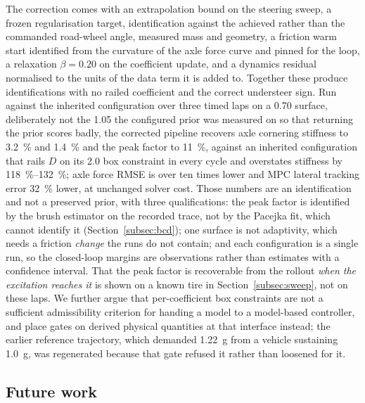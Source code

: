 The correction comes with an extrapolation bound on the steering sweep, a
frozen regularisation target, identification against the achieved rather than
the commanded road-wheel angle, measured mass and geometry, a friction
warm start identified from the curvature of the axle force curve and pinned for
the loop, a relaxation $\beta=\num{0.20}$ on the coefficient update, and a
dynamics residual normalised to the units of the data term it is added to.
Together these produce identifications with no railed coefficient and the
correct understeer sign. Run against the inherited configuration over three
timed laps on a \num{0.70} surface, deliberately not the \num{1.05} the
configured prior was measured on so that returning the prior scores badly, the
corrected pipeline recovers axle cornering stiffness to \SI{3.2}{\percent} and
\SI{1.4}{\percent} and the peak factor to \SI{11}{\percent}, against an
inherited configuration that rails $D$ on its \num{2.0} box constraint in every
cycle and overstates stiffness by \SIrange{118}{132}{\percent}; axle force RMSE
is over ten times lower and MPC lateral tracking error \SI{32}{\percent} lower,
at unchanged solver cost. Those numbers are an identification and not a
preserved prior, with three qualifications: the peak factor is identified by
the brush estimator on the recorded trace, not by the Pacejka fit, which cannot
identify it (Section~\ref{subsec:bcd}); one surface is not adaptivity, which
needs a friction \emph{change} the runs do not contain; and each configuration
is a single run, so the closed-loop margins are observations rather than
estimates with a confidence interval. That the peak factor is recoverable from
the rollout \emph{when the excitation reaches it} is shown on a known tire in
Section~\ref{subsec:sweep}, not on these laps. We further argue that
per-coefficient box constraints are not a sufficient admissibility criterion
for handing a model to a model-based controller, and place gates on derived
physical quantities at that interface instead; the earlier reference
trajectory, which demanded \SI{1.22}{\g} from a vehicle sustaining
\SI{1.0}{\g}, was regenerated because that gate refused it rather than loosened
for it.

\subsection{Future work}

